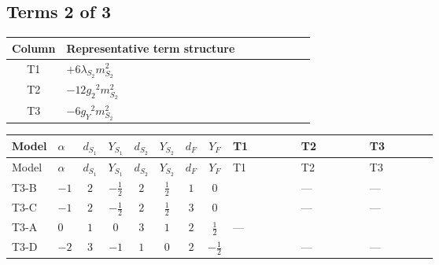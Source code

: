 \documentclass[8pt]{article}
\begin{document}
\begin{landscape}
\subsection*{Terms 2 of 3}
\begin{center}
\begin{tabular}{@{}c >{\raggedright\arraybackslash}p{0.82\linewidth}@{}}
\toprule
Column & Representative term structure \\
\midrule
T1 & \(\displaystyle +6 {\lambda_{S_2}} {m_{S_2}^2}\) \\
\midrule
T2 & \(\displaystyle -12 {g_2}^2 {m_{S_2}^2}\) \\
\midrule
T3 & \(\displaystyle -6 {g_Y}^2 {m_{S_2}^2}\) \\
\midrule
\bottomrule
\end{tabular}
\end{center}
\smallskip
\tiny
\begin{longtable}{@{}llcccccc >{\raggedright\arraybackslash}p{0.21\linewidth} >{\raggedright\arraybackslash}p{0.21\linewidth} >{\raggedright\arraybackslash}p{0.21\linewidth}@{}}
\toprule
Model & $\alpha$ & $d_{S_1}$ & $Y_{S_1}$ & $d_{S_2}$ & $Y_{S_2}$ & $d_F$ & $Y_F$ & T1 & T2 & T3 \\
\midrule
\endfirsthead
\toprule
Model & $\alpha$ & $d_{S_1}$ & $Y_{S_1}$ & $d_{S_2}$ & $Y_{S_2}$ & $d_F$ & $Y_F$ & T1 & T2 & T3 \\
\midrule
\endhead
T3-B & $-1$ & $2$ & $-\frac{1}{2}$ & $2$ & $\frac{1}{2}$ & $1$ & $0$ & \scriptsize\adjustbox{max width=\linewidth}{$\begin{gathered} +6 {\lambda_{S_2}} {m_{S_2}^2}\end{gathered}$} & --- & --- \\
\midrule
T3-C & $-1$ & $2$ & $-\frac{1}{2}$ & $2$ & $\frac{1}{2}$ & $3$ & $0$ & \scriptsize\adjustbox{max width=\linewidth}{$\begin{gathered} +6 {\lambda_{S_2}} {m_{S_2}^2}\end{gathered}$} & --- & --- \\
\midrule
T3-A & $0$ & $1$ & $0$ & $3$ & $1$ & $2$ & $\frac{1}{2}$ & --- & \scriptsize\adjustbox{max width=\linewidth}{$\begin{gathered} -12 {g_2}^2 {m_{S_2}^2}\end{gathered}$} & \scriptsize\adjustbox{max width=\linewidth}{$\begin{gathered} -6 {g_Y}^2 {m_{S_2}^2}\end{gathered}$} \\
\midrule
T3-D & $-2$ & $3$ & $-1$ & $1$ & $0$ & $2$ & $-\frac{1}{2}$ & \scriptsize\adjustbox{max width=\linewidth}{$\begin{gathered} +4 {\lambda_{S_2}} {m_{S_2}^2}\end{gathered}$} & --- & --- \\

\end{longtable}
\end{landscape}
\end{document}
